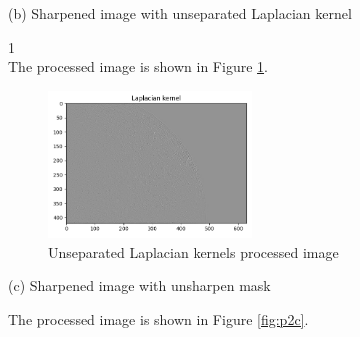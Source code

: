 (b) Sharpened image with unseparated Laplacian kernel

1\\


The processed image is shown in Figure \ref{fig:p2b}.

\begin{figure}[htbp]
    \centering
	\includegraphics[width=0.48\textwidth]{../images/p2/p2b_Laplacian.png}
    \caption{Unseparated Laplacian kernels processed image}
\label{fig:p2b}
\end{figure}

(c) Sharpened image with unsharpen mask

The processed image is shown in Figure \ref{fig:p2c}.







